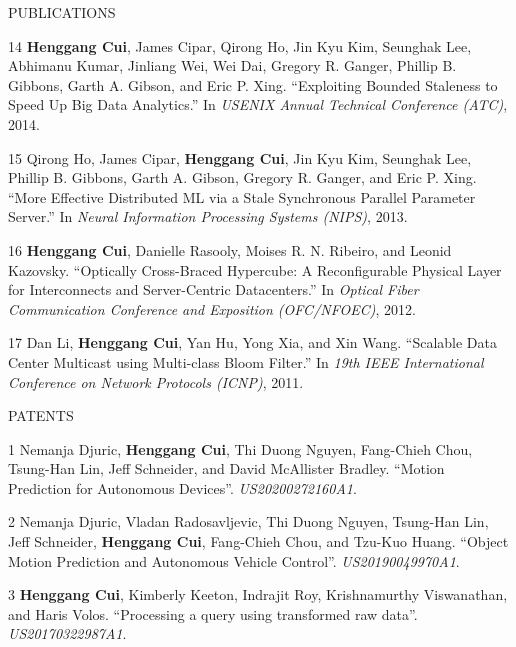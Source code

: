 \documentclass{resume} %
\begin{document}
\begin{rSection}{PUBLICATIONS}
{    \item
    [14]
        {\bf Henggang Cui}, James Cipar, Qirong Ho, Jin Kyu Kim, Seunghak Lee, Abhimanu Kumar, Jinliang Wei, Wei Dai, Gregory R. Ganger, Phillip B. Gibbons, Garth A. Gibson, and Eric P. Xing.
        ``Exploiting Bounded Staleness to Speed Up Big Data Analytics.''
        In \emph{USENIX Annual Technical Conference (ATC)}, 2014.
    \item
    [15]
        Qirong Ho, James Cipar, {\bf Henggang Cui}, Jin Kyu Kim, Seunghak Lee, Phillip B. Gibbons, Garth A. Gibson, Gregory R. Ganger, and Eric P. Xing.
        ``More Effective Distributed ML via a Stale Synchronous Parallel Parameter Server.''
        In \emph{Neural Information Processing Systems (NIPS)}, 2013.
    \item
    [16]
        {\bf Henggang Cui}, Danielle Rasooly, Moises R. N. Ribeiro, and Leonid Kazovsky.
        ``Optically Cross-Braced Hypercube: A Reconfigurable Physical Layer for Interconnects and Server-Centric Datacenters.''
        In \emph{Optical Fiber Communication Conference and Exposition (OFC/NFOEC)}, 2012.
    \item
    [17]
        Dan Li, {\bf Henggang Cui}, Yan Hu, Yong Xia, and Xin Wang.
        ``Scalable Data Center Multicast using Multi-class Bloom Filter.''
        In \emph{19th IEEE International Conference on Network Protocols (ICNP)}, 2011.
}
\end{rSection}
\vspace{-.05in}



\begin{rSection}{PATENTS}
\vspace{-.1in}
\footnotesize{
    \item
    [1]
        Nemanja Djuric, {\bf Henggang Cui}, Thi Duong Nguyen, Fang-Chieh Chou, Tsung-Han Lin, Jeff Schneider, and David McAllister Bradley.
        ``Motion Prediction for Autonomous Devices''.
        \emph{US20200272160A1}.
    \item
    [2]
        Nemanja Djuric, Vladan Radosavljevic, Thi Duong Nguyen, Tsung-Han Lin, Jeff Schneider, {\bf Henggang Cui}, Fang-Chieh Chou, and Tzu-Kuo Huang.
        ``Object Motion Prediction and Autonomous Vehicle Control''.
        \emph{US20190049970A1}.
    \item
    [3]
        {\bf Henggang Cui}, Kimberly Keeton, Indrajit Roy, Krishnamurthy Viswanathan, and Haris Volos.
        ``Processing a query using transformed raw data''.
        \emph{US20170322987A1}.
}
\end{rSection}
\vspace{-.05in}
\end{document}
